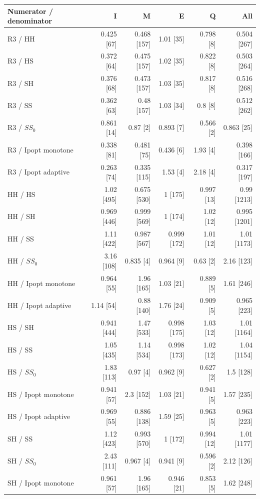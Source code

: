 \begin{tabular}{@{}lrrrrr@{}}
\toprule
Numerator / denominator & I & M & E & Q & All\\
\midrule
R3 / HH & 0.425 [67] & 0.468 [157] & 1.01 [35] & 0.798 [8] & 0.504 [267]\\
R3 / HS & 0.372 [64] & 0.475 [157] & 1.02 [35] & 0.822 [8] & 0.503 [264]\\
R3 / SH & 0.376 [68] & 0.473 [157] & 1.03 [35] & 0.817 [8] & 0.516 [268]\\
R3 / SS & 0.362 [63] & 0.48 [157] & 1.03 [34] & 0.8 [8] & 0.512 [262]\\
R3 / $SS_0$ & 0.861 [14] & 0.87 [2] & 0.893 [7] & 0.566 [2] & 0.863 [25]\\
R3 / Ipopt monotone & 0.338 [81] & 0.481 [75] & 0.436 [6] & 1.93 [4] & 0.398 [166]\\
R3 / Ipopt adaptive & 0.263 [74] & 0.335 [115] & 1.53 [4] & 2.18 [4] & 0.317 [197]\\
HH / HS & 1.02 [495] & 0.675 [530] & 1 [175] & 0.997 [13] & 0.99 [1213]\\
HH / SH & 0.969 [446] & 0.999 [569] & 1 [174] & 1.02 [12] & 0.995 [1201]\\
HH / SS & 1.11 [422] & 0.987 [567] & 0.999 [172] & 1.01 [12] & 1.01 [1173]\\
HH / $SS_0$ & 3.16 [108] & 0.835 [4] & 0.964 [9] & 0.63 [2] & 2.16 [123]\\
HH / Ipopt monotone & 0.964 [55] & 1.96 [165] & 1.03 [21] & 0.889 [5] & 1.61 [246]\\
HH / Ipopt adaptive & 1.14 [54] & 0.88 [140] & 1.76 [24] & 0.909 [5] & 0.965 [223]\\
HS / SH & 0.941 [444] & 1.47 [533] & 0.998 [175] & 1.03 [12] & 1.01 [1164]\\
HS / SS & 1.05 [435] & 1.14 [534] & 0.998 [173] & 1.02 [12] & 1.04 [1154]\\
HS / $SS_0$ & 1.83 [113] & 0.97 [4] & 0.962 [9] & 0.627 [2] & 1.5 [128]\\
HS / Ipopt monotone & 0.941 [57] & 2.3 [152] & 1.03 [21] & 0.941 [5] & 1.57 [235]\\
HS / Ipopt adaptive & 0.969 [55] & 0.886 [138] & 1.59 [25] & 0.963 [5] & 0.963 [223]\\
SH / SS & 1.12 [423] & 0.993 [570] & 1 [172] & 0.994 [12] & 1.01 [1177]\\
SH / $SS_0$ & 2.43 [111] & 0.967 [4] & 0.941 [9] & 0.596 [2] & 2.12 [126]\\
SH / Ipopt monotone & 0.961 [57] & 1.96 [165] & 0.946 [21] & 0.853 [5] & 1.62 [248]\\

\end{tabular}
